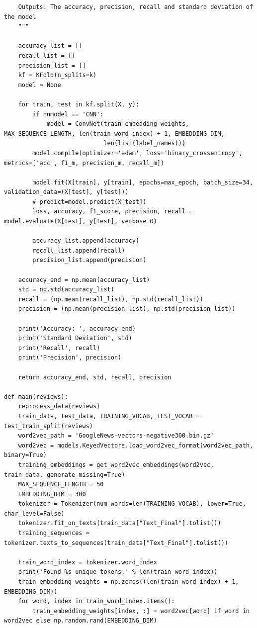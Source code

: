 \documentclass[11pt]{article} %
\begin{document}
\begin{verbatim}
    Outputs: The accuracy, precision, recall and standard deviation of the model
    """

    accuracy_list = []
    recall_list = []
    precision_list = []
    kf = KFold(n_splits=k)
    model = None

    for train, test in kf.split(X, y):
        if nnmodel == 'CNN':
            model = ConvNet(train_embedding_weights, MAX_SEQUENCE_LENGTH, len(train_word_index) + 1, EMBEDDING_DIM,
                            len(list(label_names)))
        model.compile(optimizer='adam', loss='binary_crossentropy', metrics=['acc', f1_m, precision_m, recall_m])

        model.fit(X[train], y[train], epochs=max_epoch, batch_size=34, validation_data=(X[test], y[test]))
        # predict=model.predict(X[test])
        loss, accuracy, f1_score, precision, recall = model.evaluate(X[test], y[test], verbose=0)

        accuracy_list.append(accuracy)
        recall_list.append(recall)
        precision_list.append(precision)

    accuracy_end = np.mean(accuracy_list)
    std = np.std(accuracy_list)
    recall = (np.mean(recall_list), np.std(recall_list))
    precision = (np.mean(precision_list), np.std(precision_list))

    print('Accuracy: ', accuracy_end)
    print('Standard Deviation', std)
    print('Recall', recall)
    print('Precision', precision)

    return accuracy_end, std, recall, precision

def main(reviews):
    reprocess_data(reviews)
    train_data, test_data, TRAINING_VOCAB, TEST_VOCAB = test_train_split(reviews)
    word2vec_path = 'GoogleNews-vectors-negative300.bin.gz'
    word2vec = models.KeyedVectors.load_word2vec_format(word2vec_path, binary=True)
    training_embeddings = get_word2vec_embeddings(word2vec, train_data, generate_missing=True)
    MAX_SEQUENCE_LENGTH = 50
    EMBEDDING_DIM = 300
    tokenizer = Tokenizer(num_words=len(TRAINING_VOCAB), lower=True, char_level=False)
    tokenizer.fit_on_texts(train_data["Text_Final"].tolist())
    training_sequences = tokenizer.texts_to_sequences(train_data["Text_Final"].tolist())

    train_word_index = tokenizer.word_index
    print('Found %s unique tokens.' % len(train_word_index))
    train_embedding_weights = np.zeros((len(train_word_index) + 1, EMBEDDING_DIM))
    for word, index in train_word_index.items():
        train_embedding_weights[index, :] = word2vec[word] if word in word2vec else np.random.rand(EMBEDDING_DIM)


\end{verbatim}
\end{document}

